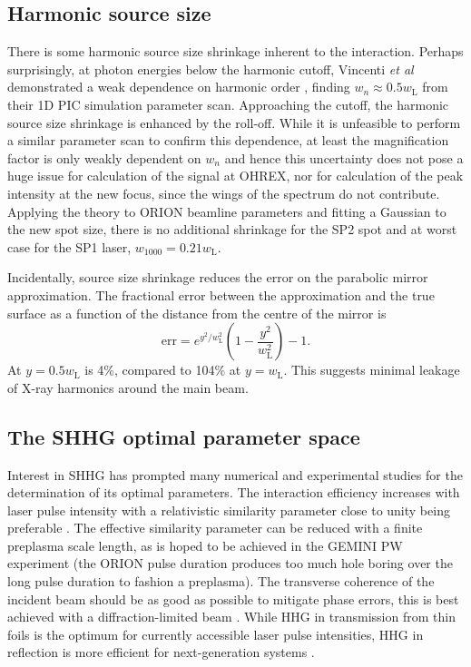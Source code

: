 \subsection{Harmonic source size}
There is some harmonic source size shrinkage inherent to the interaction. Perhaps surprisingly, at photon energies below the harmonic cutoff, Vincenti \textit{et al} demonstrated a weak dependence on harmonic order \cite{vincentiOpticalPropertiesRelativistic2014}, finding $w_n \approx 0.5 w_\mathrm{L}$ from their 1D PIC simulation parameter scan. Approaching the cutoff, the harmonic source size shrinkage is enhanced by the roll-off. While it is unfeasible to perform a similar parameter scan to confirm this dependence, at least the magnification factor is only weakly dependent on $w_n$ and hence this uncertainty does not pose a huge issue for calculation of the signal at OHREX, nor for calculation of the peak intensity at the new focus, since the wings of the spectrum do not contribute. Applying the theory to ORION beamline parameters and fitting a Gaussian to the new spot size, there is no additional shrinkage for the SP2 spot and at worst case for the SP1 laser, $w_{1000} = 0.21w_\mathrm{L}$.

Incidentally, source size shrinkage reduces the error on the parabolic mirror approximation. The fractional error between the approximation and the true surface as a function of the distance from the centre of the mirror is
\begin{equation}
	\mathrm{err} = e^{y^2/w^2_\mathrm{L}}\left(1-\frac{y^2}{w^2_\mathrm{L}}\right)-1.
\end{equation}
At $y=0.5 w_\mathrm{L}$ is 4\%, compared to 104\% at $y= w_\mathrm{L}$. This suggests minimal leakage of X-ray harmonics around the main beam.

\subsection{The SHHG optimal parameter space}
Interest in SHHG has prompted many numerical and experimental studies for the determination of its optimal parameters. The interaction efficiency increases with laser pulse intensity \cite{pukhovRelativisticHighHarmonics2009, edwardsXRayEmissionEffectiveness2020} with a relativistic similarity parameter close to unity being preferable \cite{edwardsXRayEmissionEffectiveness2020, gonoskovUltrarelativisticNanoplasmonicsRoute2011}. The effective similarity parameter can be reduced with a finite preplasma scale length, as is hoped to be achieved in the GEMINI PW experiment (the ORION pulse duration produces too much hole boring over the long pulse duration to fashion a preplasma). The transverse coherence of the incident beam should be as good as possible to mitigate phase errors, this is best achieved with a diffraction-limited beam \cite{dromeyHighHarmonicGeneration2006}. While HHG in transmission from thin foils is the optimum for currently accessible laser pulse intensities, HHG in reflection is more efficient for next-generation systems \cite{edwardsElectronNanobunchWidthDominatedSpectralPower2020}. 

